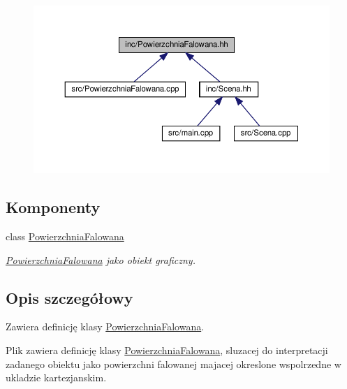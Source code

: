 \begin{figure}[H]
\begin{center}
\leavevmode
\includegraphics[width=350pt]{PowierzchniaFalowana_8hh__dep__incl}
\end{center}
\end{figure}
\subsection*{Komponenty}
\begin{DoxyCompactItemize}
\item 
class \hyperlink{classPowierzchniaFalowana}{Powierzchnia\+Falowana}
\begin{DoxyCompactList}\small\item\em \hyperlink{classPowierzchniaFalowana}{Powierzchnia\+Falowana} jako obiekt graficzny. \end{DoxyCompactList}\end{DoxyCompactItemize}


\subsection{Opis szczegółowy}
Zawiera definicję klasy \hyperlink{classPowierzchniaFalowana}{Powierzchnia\+Falowana}. 

Plik zawiera definicję klasy \hyperlink{classPowierzchniaFalowana}{Powierzchnia\+Falowana}, sluzacej do interpretacji zadanego obiektu jako powierzchni falowanej majacej okreslone wspolrzedne w ukladzie kartezjanskim. 